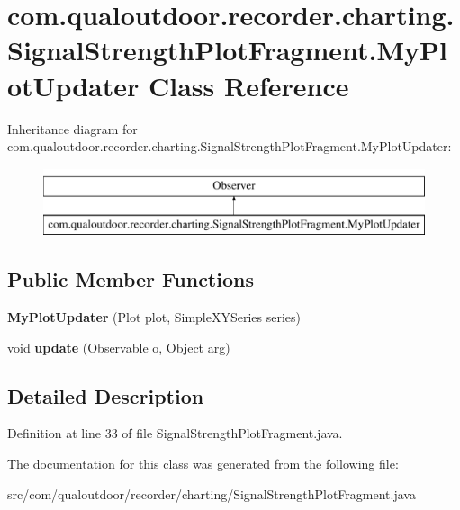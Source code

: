 \hypertarget{classcom_1_1qualoutdoor_1_1recorder_1_1charting_1_1SignalStrengthPlotFragment_1_1MyPlotUpdater}{\section{com.\-qualoutdoor.\-recorder.\-charting.\-Signal\-Strength\-Plot\-Fragment.\-My\-Plot\-Updater Class Reference}
\label{classcom_1_1qualoutdoor_1_1recorder_1_1charting_1_1SignalStrengthPlotFragment_1_1MyPlotUpdater}
}
Inheritance diagram for com.\-qualoutdoor.\-recorder.\-charting.\-Signal\-Strength\-Plot\-Fragment.\-My\-Plot\-Updater\-:\begin{figure}[H]
\begin{center}
\leavevmode
\includegraphics[height=2.000000cm]{classcom_1_1qualoutdoor_1_1recorder_1_1charting_1_1SignalStrengthPlotFragment_1_1MyPlotUpdater}
\end{center}
\end{figure}
\subsection*{Public Member Functions}
\begin{DoxyCompactItemize}
\item 
\hypertarget{classcom_1_1qualoutdoor_1_1recorder_1_1charting_1_1SignalStrengthPlotFragment_1_1MyPlotUpdater_acd5730b92572c862a7b2385e1e79ee17}{{\bfseries My\-Plot\-Updater} (Plot plot, Simple\-X\-Y\-Series series)}\label{classcom_1_1qualoutdoor_1_1recorder_1_1charting_1_1SignalStrengthPlotFragment_1_1MyPlotUpdater_acd5730b92572c862a7b2385e1e79ee17}

\item 
\hypertarget{classcom_1_1qualoutdoor_1_1recorder_1_1charting_1_1SignalStrengthPlotFragment_1_1MyPlotUpdater_ac8a7043ac6fac3a20c284ba929340e00}{void {\bfseries update} (Observable o, Object arg)}\label{classcom_1_1qualoutdoor_1_1recorder_1_1charting_1_1SignalStrengthPlotFragment_1_1MyPlotUpdater_ac8a7043ac6fac3a20c284ba929340e00}

\end{DoxyCompactItemize}


\subsection{Detailed Description}


Definition at line 33 of file Signal\-Strength\-Plot\-Fragment.\-java.



The documentation for this class was generated from the following file\-:\begin{DoxyCompactItemize}
\item 
src/com/qualoutdoor/recorder/charting/Signal\-Strength\-Plot\-Fragment.\-java\end{DoxyCompactItemize}
